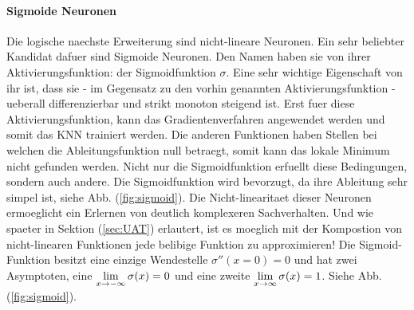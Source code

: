 \documentclass[../main]{subfiles}
\begin{document}
\paragraph{Sigmoide Neuronen}
Die logische naechste Erweiterung sind nicht-lineare Neuronen.
Ein sehr beliebter Kandidat dafuer sind Sigmoide Neuronen.
Den Namen haben sie von ihrer Aktivierungsfunktion: der Sigmoidfunktion $\sigma$.
Eine sehr wichtige Eigenschaft von ihr ist, dass sie - im Gegensatz zu den vorhin
genannten Aktivierungsfunktion - ueberall differenzierbar und strikt monoton
steigend ist. Erst fuer diese Aktivierungsfunktion, kann das Gradientenverfahren
angewendet werden und somit das KNN trainiert werden. Die anderen
Funktionen haben Stellen bei welchen die Ableitungsfunktion null
betraegt, somit kann das lokale Minimum nicht gefunden werden.
Nicht nur die Sigmoidfunktion erfuellt diese Bedingungen, sondern auch andere. Die Sigmoidfunktion wird
bevorzugt, da ihre Ableitung sehr simpel ist, siehe Abb. (\ref{fig:sigmoid}).
Die Nicht-linearitaet dieser Neuronen ermoeglicht ein Erlernen von deutlich komplexeren Sachverhalten.
Und wie spaeter in Sektion (\ref{sec:UAT}) erlautert, ist es moeglich mit der Kompostion von nicht-linearen
Funktionen jede belibige Funktion zu approximieren!
\para{}
Die Sigmoid-Funktion besitzt eine einzige Wendestelle $\sigma''(x=0)=0$ und hat
zwei Asymptoten, eine $\displaystyle\lim_{x \to -\infty} \sigma(x)=0$
und eine zweite $\displaystyle\lim_{x \to \infty} \sigma(x)=1$. Siehe Abb. (\ref{fig:sigmoid}).
\end{document}

